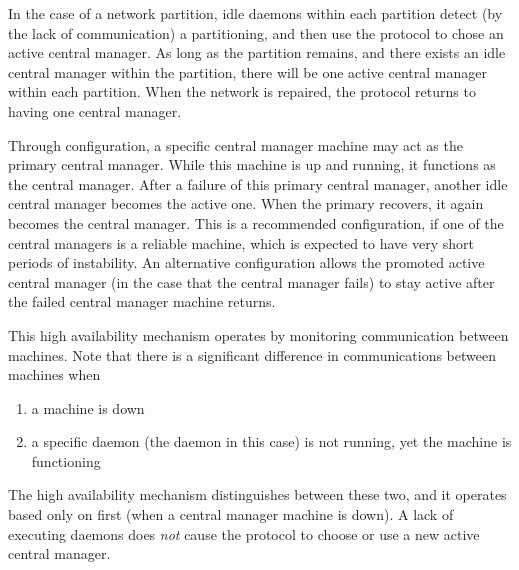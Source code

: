 In the case of a network partition,
idle  daemons within each partition
detect (by the lack of communication) a partitioning,
and then use the protocol to chose an active central manager.
As long as the partition remains, 
and there exists an idle central manager within the partition,
there will be one active central manager within each partition.
When the network is repaired,
the protocol returns to having one central manager.

Through configuration,
a specific central manager machine may act as the
primary central manager.
While this machine is up and running, 
it functions as the central manager.
After a failure of this primary central manager,
another idle central manager becomes the active one.
When the primary recovers,
it again becomes the central manager.
This is a recommended configuration,
if one of the central managers is a reliable machine,
which is expected to have very short periods of instability.
An alternative configuration allows the promoted 
active central manager 
(in the case that the central manager fails)
to stay active after the failed central manager machine
returns.

This high availability mechanism operates by monitoring
communication between machines.
Note that there is a significant difference in
communications between machines when 
\begin{enumerate}
\item 
a machine is down
\item 
a specific daemon (the  daemon in this case)
is not running, yet the machine is functioning
\end{enumerate}
The high availability mechanism distinguishes between these two,
and it operates based only on first
(when a central manager machine is down).
A lack of executing daemons does \emph{not}
cause the protocol to choose or use a new active central manager. 



